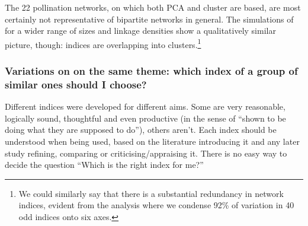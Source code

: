 \documentclass[a4paper, 11pt]{article}
\begin{document}
The 22 pollination networks, on which both PCA and cluster are based, are most certainly not representative of bipartite networks in general. The simulations of \citet{Dormann2009} for a wider range of sizes and linkage densities show a qualitatively similar picture, though: indices are overlapping into clusters.\footnote{We could similarly say that there is a substantial redundancy in network indices, evident from the analysis where we condense 92\% of variation in 40 odd indices onto six axes.}



\subsubsection{Variations on on the same theme: which index of a group of similar ones should I choose?}


Different indices were developed for different aims. Some are very reasonable, logically sound, thoughtful and even productive (in the sense of ``shown to be doing what they are supposed to do''), others aren't. Each index should be understood when being used, based on the literature introducing it and any later study refining, comparing or criticising/appraising it. There is no easy way to decide the question ``Which is the right index for me?''
\end{document}
